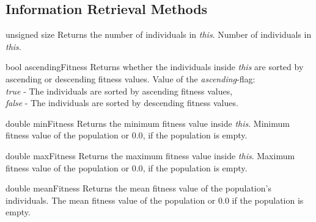 \subsection{Information Retrieval Methods}

\setConstInstance
\printEmptyMethodReturn
{unsigned}
{size}
{Returns the number of individuals in {\em this}.}
{Number of individuals in {\em this}.}

\clearpage

\setNormalInstance
\printEmptyMethodReturn
{bool}
{ascendingFitness}
{Returns whether the individuals inside {\em this} are
 sorted by ascending or descending fitness values.}
{Value of the {\em ascending}-flag:\\
 {\em true} - The individuals are sorted by ascending fitness values,\\
                    {\em false} - The individuals are sorted by descending
 fitness values.}

\vspace*{4ex}

\setConstInstance
\printEmptyMethodReturn
{double}
{minFitness}
{Returns the minimum fitness value inside {\em this}.}
{Minimum fitness value of the population or $0.0$, if the population
 is empty.}

\vspace*{4ex}

\setConstInstance
\printEmptyMethodReturn
{double}
{maxFitness}
{Returns the maximum fitness value inside {\em this}.}
{Maximum fitness value of the population or $0.0$, if the population
 is empty.}

\vspace*{4ex}

\setConstInstance
\printEmptyMethodReturn
{double}
{meanFitness}
{Returns the mean fitness value of the population's individuals.}
{The mean fitness value of the population or $0.0$ if the population
 is empty.}

